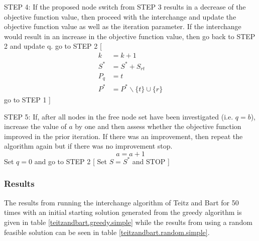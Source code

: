 \documentclass[11pt]{article}
\begin{document}
	\begin{algorithm}
		\begin{algorithmic}[0]
			
			\Statex 
			\Statex STEP 4: If the proposed node switch from STEP 3 results in a decrease of the objective function value, then proceed with the interchange and update the objective function value as well as the  iteration parameter.  If the interchange would result in an increase in the objective function value, then go back to STEP 2 and update q.
			\Statex go to STEP 2
			[
			\begin{align*}
			k &= k+1\\
			S^* &= S^* + S_{rt}\\
			P_q &= t\\
			P^* & = P^*\backslash \{t\} \cup \{r\}		
			\end{align*}
			\Statex go to STEP 1				
			]
			\EndIf
			
			\Statex	
			
			\Statex 
			\Statex STEP 5: If, after all nodes in the free node set have been investigated (i.e. $q=b$), increase the value of $a$ by one and then assess whether the objective function improved in the prior iteration.  If there was an improvement, then repeat the algorithm again but if there was no improvement stop.
			\begin{equation*}
			a = a+1
			\end{equation*}
			\Statex Set $q=0$ and go to STEP 2
			[
			\Statex Set $S=S^*$ and STOP
			]
			\EndIf
			
			
		\end{algorithmic}
	\end{algorithm}

	\subsubsection{Results}
	The results from running the interchange algorithm of Teitz and Bart for 50 times with an initial starting solution generated from the greedy algorithm is given in table \ref{teitzandbart.greedy.simple} while the results from using a random feasible solution can be seen in table \ref{teitzandbart.random.simple}.
	
\end{document}
